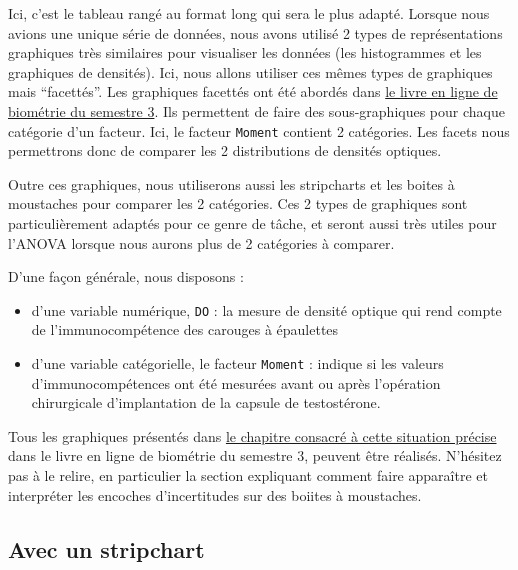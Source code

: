 \documentclass[
  a4paper,
  DIV=11,
  numbers=noendperiod,
  oneside]{scrreprt}
\providecommand{\tightlist}{%
  \setlength{\itemsep}{0pt}\setlength{\parskip}{0pt}}\usepackage{longtable,booktabs,array}
\begin{document}
Ici, c'est le tableau rangé au format long qui sera le plus adapté.
Lorsque nous avions une unique série de données, nous avons utilisé 2
types de représentations graphiques très similaires pour visualiser les
données (les histogrammes et les graphiques de densités). Ici, nous
allons utiliser ces mêmes types de graphiques mais ``facettés''. Les
graphiques facettés ont été abordés dans
\href{https://besibo.github.io/BiometrieS3/03-visualization.html\#diagrammes-bâtons-facettés}{le
livre en ligne de biométrie du semestre 3}. Ils permettent de faire des
sous-graphiques pour chaque catégorie d'un facteur. Ici, le facteur
\texttt{Moment} contient 2 catégories. Les facets nous permettrons donc
de comparer les 2 distributions de densités optiques.

Outre ces graphiques, nous utiliserons aussi les stripcharts et les
boites à moustaches pour comparer les 2 catégories. Ces 2 types de
graphiques sont particulièrement adaptés pour ce genre de tâche, et
seront aussi très utiles pour l'ANOVA lorsque nous aurons plus de 2
catégories à comparer.

D'une façon générale, nous disposons :

\begin{itemize}
\tightlist
\item
  d'une variable numérique, \texttt{DO} : la mesure de densité optique
  qui rend compte de l'immunocompétence des carouges à épaulettes
\item
  d'une variable catégorielle, le facteur \texttt{Moment} : indique si
  les valeurs d'immunocompétences ont été mesurées avant ou après
  l'opération chirurgicale d'implantation de la capsule de testostérone.
\end{itemize}

Tous les graphiques présentés dans
\href{https://besibo.github.io/BiometrieS3/03-visualization.html\#une-variable-de-chaque-type}{le
chapitre consacré à cette situation précise} dans le livre en ligne de
biométrie du semestre 3, peuvent être réalisés. N'hésitez pas à le
relire, en particulier la section expliquant comment faire apparaître et
interpréter les encoches d'incertitudes sur des boiites à moustaches.

\hypertarget{avec-un-stripchart}{%
\subsection{Avec un stripchart}\label{avec-un-stripchart}}
\end{document}
